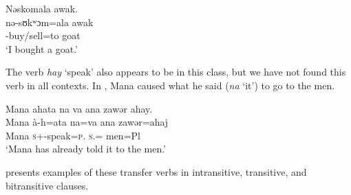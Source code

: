 \ea \label{ex:9:41}
Nəskomala  awak.\\
\gll  nə-sʊkʷɔm=ala   awak\\
      {\oneS}-buy/sell=to  goat\\
\glt  ‘I bought a goat.’ 
\z

The verb \textit{hay} ‘speak’ also appears to be in this class, but we have not found this verb in all contexts. In , Mana caused what he said (\textit{na} ‘it’) to go to the men.  

\ea \label{ex:9:42}
Mana  ahata  na  va  ana  zawər  ahay.\\
\gll  Mana   à-h=ata   na=va   ana   zawər=ahaj\\
      Mana  \textsc{s}+{\PFV}-speak=\textsc{p}.{\IO}  \textsc{s}.{\DO}={\PRF}  {\DAT} men=Pl\\
\glt  ‘Mana has already told it to the men.’
\z

 presents examples of these transfer verbs in intransitive, transitive, and bitransitive clauses.

